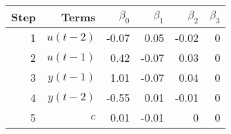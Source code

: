 \begin{tabular}{rrrrrr}
Step & Terms & $\beta_{0}$ & $\beta_{1}$ & $\beta_{2}$ & $\beta_{3}$ \\ 
\hline 
1 & $u(t-2)$ & -0.07 & 0.05 & -0.02 & 0 \\ 
2 & $u(t-1)$ & 0.42 & -0.07 & 0.03 & 0 \\ 
3 & $y(t-1)$ & 1.01 & -0.07 & 0.04 & 0 \\ 
4 & $y(t-2)$ & -0.55 & 0.01 & -0.01 & 0 \\ 
5 & $c$ & 0.01 & -0.01 & 0 & 0 \\ 
\hline 
\end{tabular}